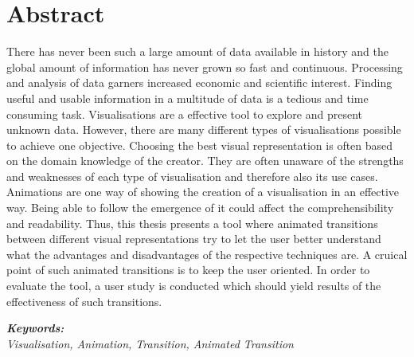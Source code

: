 \section*{Abstract}
\vspace{0.5cm}

There has never been such a large amount of data available in history and the global amount of information has never grown so fast and continuous. Processing and analysis of data garners increased economic and scientific interest. Finding useful and usable information in a multitude of data is a tedious and time consuming task. Visualisations are a effective tool to explore and present unknown data. However, there are many different types of visualisations possible to achieve one objective. Choosing the best visual representation is often based on the domain knowledge of the creator. They are often unaware of the strengths and weaknesses of each type of visualisation and therefore also its use cases. Animations are one way of showing the creation of a visualisation in an effective way. Being able to follow the emergence of it could affect the comprehensibility and readability. Thus, this thesis presents a tool where animated transitions between different visual representations try to let the user better understand what the advantages and disadvantages of the respective techniques are. A cruical point of such animated transitions is to keep the user oriented. In order to evaluate the tool, a user study is conducted which should yield results of the effectiveness of such transitions.

\vspace{0.5cm}
\textbf{\textit{Keywords:}} \\
\textit{Visualisation, Animation, Transition, Animated Transition}